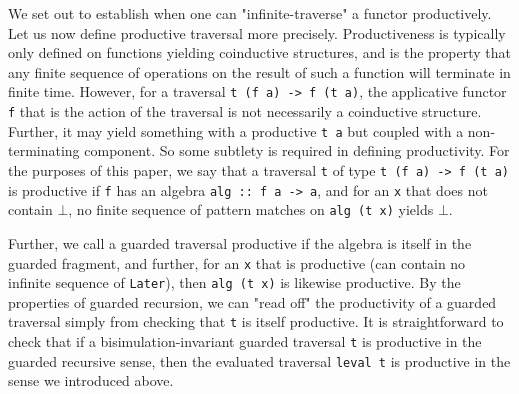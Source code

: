 \documentclass[hoptionsi,review,format=sigplan]{acmart}
\newcommand{\hs}{\texttt}
\newcommand{\hsn}{\texttt}
\begin{document}





We set out to establish when one can "infinite-traverse" a functor productively. Let us now define productive traversal more precisely. Productiveness is typically only defined on functions yielding coinductive structures, and is the property that any finite sequence of operations on the result of such a function will terminate in finite time. However, for a traversal \hsn{t (f a) -> f (t a)}, the applicative functor \hs{f} that is the action of the traversal is not necessarily a coinductive structure. Further, it may yield something with a productive \hs{t a} but coupled with a non-terminating component. So some subtlety is required in defining productivity. For the purposes of this paper, we say that a traversal \hs{t} of type \hsn{t (f a) -> f (t a)} is productive if \hs{f} has an algebra \hs{alg :: f a -> a}, and for an \hs{x} that does not contain $\bot$, no finite sequence of pattern matches on \hsn{alg (t x)} yields $\bot$.

Further, we call a guarded traversal productive if the algebra is itself in the guarded fragment, and further, for an \hs{x} that is productive (can contain no infinite sequence of \hs{Later}), then \hsn{alg (t x)} is likewise productive. By the properties of guarded recursion, we can "read off" the productivity of a guarded traversal simply from checking that \hs{t} is itself productive. It is straightforward to check that if a bisimulation-invariant guarded traversal \hs{t} is productive in the guarded recursive sense, then the evaluated traversal \hs{leval t} is productive in the sense we introduced above.
\end{document}
